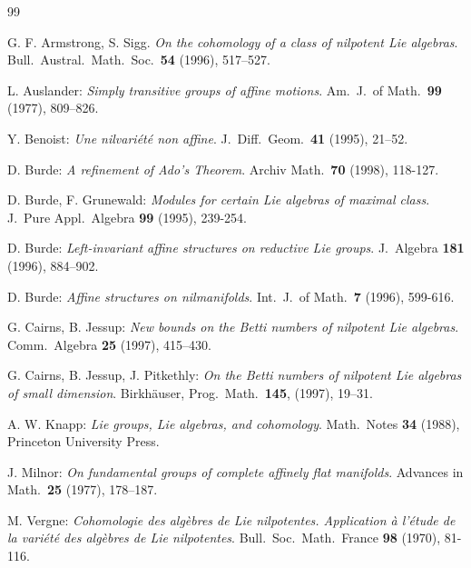 \documentclass[12pt]{amsart}
\theoremstyle{definition}
\theoremstyle{remark}
\begin{document}
\begin{thebibliography}{99}

 G. F. Armstrong, S. Sigg. {\it On the cohomology
of a class of nilpotent Lie algebras}. Bull.\ Austral.\ Math.\ Soc.\
\textbf{54} (1996), 517--527.

 L. Auslander: {\it Simply transitive groups of affine
motions}. Am.\ J.\ of Math.\ \textbf{99} (1977), 809--826.

 Y. Benoist: {\it Une nilvari\'et\'e non affine}.
J.\ Diff.\ Geom.\ \textbf{41} (1995), 21--52.    

 D. Burde: {\it A refinement of Ado's Theorem}. Archiv Math.\
\textbf{70} (1998), 118-127.   

 D. Burde, F. Grunewald: {\it Modules for certain Lie
algebras of maximal class}. J.\ Pure Appl.\ Algebra \textbf{99} (1995),
239-254.  

 D. Burde: {\it Left-invariant affine structures on
reductive Lie groups}. J.\ Algebra \textbf{181} (1996), 884--902.   

\bibitem{BU3} D. Burde: {\it Affine structures on nilmanifolds}. Int.\ J.\
of Math.\ \textbf{7} (1996), 599-616.  

\bibitem{CJ} G. Cairns, B. Jessup: {\it New bounds on the Betti numbers
of nilpotent Lie algebras}. Comm.\ Algebra \textbf{25} (1997),
415--430.     

\bibitem{CJP} G. Cairns, B. Jessup, J. Pitkethly: {\it
On the Betti numbers of nilpotent Lie algebras of small dimension}.
Birkh\"auser, Prog.\ Math.\ \textbf{145}, (1997), 19--31.

\bibitem{KNA} A. W. Knapp: {\it Lie groups, Lie algebras, and cohomology}.
Math.\ Notes \textbf{34} (1988), Princeton University Press.

\bibitem{M2} J. Milnor: {\it On fundamental groups of complete affinely
flat manifolds}. Advances in Math.\ \textbf{25} (1977), 178--187.    

\bibitem{V} M. Vergne: {\it Cohomologie des alg\`ebres de Lie nilpotentes.
Application \`a l'\'etude de la vari\'et\'e des alg\`ebres de Lie
nilpotentes}. Bull.\ Soc.\ Math.\ France \textbf{98} (1970), 81-116.



\end{thebibliography}
\end{document}
